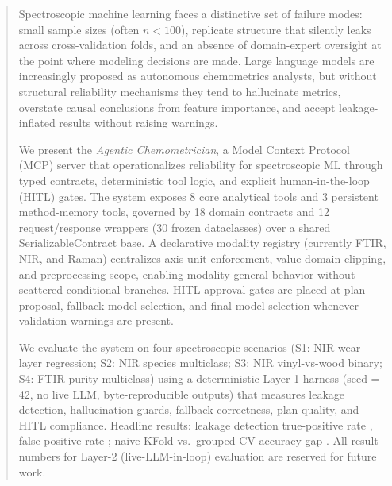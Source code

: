 
\begin{abstract}
Spectroscopic machine learning faces a distinctive set of failure modes:
small sample sizes (often $n < 100$), replicate structure that silently leaks
across cross-validation folds, and an absence of domain-expert oversight at
the point where modeling decisions are made.
Large language models are increasingly proposed as autonomous chemometrics
analysts, but without structural reliability mechanisms they tend to hallucinate
metrics, overstate causal conclusions from feature importance, and accept
leakage-inflated results without raising warnings.

We present the \emph{Agentic Chemometrician}, a Model Context Protocol (MCP)
server that operationalizes reliability for spectroscopic ML through typed
contracts, deterministic tool logic, and explicit human-in-the-loop (HITL)
gates.
The system exposes 8 core analytical tools and 3 persistent method-memory
tools, governed by 18 domain contracts and 12 request/response wrappers
(30 frozen dataclasses) over a shared SerializableContract base.
A declarative modality registry (currently FTIR, NIR, and Raman) centralizes
axis-unit enforcement, value-domain clipping, and preprocessing scope, enabling
modality-general behavior without scattered conditional branches.
HITL approval gates are placed at plan proposal, fallback model selection,
and final model selection whenever validation warnings are present.

We evaluate the system on four spectroscopic scenarios (S1: NIR wear-layer
regression; S2: NIR species multiclass; S3: NIR vinyl-vs-wood binary;
S4: FTIR purity multiclass) using a deterministic Layer-1 harness
(seed = 42, no live LLM, byte-reproducible outputs) that measures leakage
detection, hallucination guards, fallback correctness, plan quality,
and HITL compliance.
Headline results:
leakage detection true-positive rate ,
false-positive rate ;
naive KFold vs.\ grouped CV accuracy gap .
All result numbers for Layer-2 (live-LLM-in-loop) evaluation are reserved
for future work.
\end{abstract}

